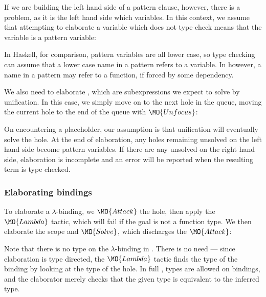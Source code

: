 If we are building the left hand side of a pattern clause, however, there is a
problem, as it is the left hand side which  variables. In this
context, we assume that attempting to elaborate a variable which does not type
check means that the variable is a pattern variable:


In Haskell, for comparison,
pattern variables are all lower case, so type checking can assume that a
lower case name in a pattern refers to a variable. In \Idris{} however, a
name in a pattern may refer to a function, if forced by some dependency.

We also need to elaborate , which are subexpressions we expect to
solve by unification. In this case, we simply move on to the next hole in the queue, moving
the current hole to the end of the queue with $\MO{Unfocus}$:


On encountering a placeholder, our assumption is that unification will
eventually solve the hole. At the end of elaboration, any holes remaining
unsolved on the left hand side become pattern variables. If there are any
unsolved on the right hand side, elaboration is incomplete and an error will
be reported when the resulting term is type checked.

\subsubsection{Elaborating bindings}

To elaborate a $\lambda$-binding, we $\MO{Attack}$ the hole, then apply the
$\MO{Lambda}$ tactic, which will fail if the goal is not a function type. We
then elaborate the scope and $\MO{Solve}$, which discharges the $\MO{Attack}$:


Note that there is no type on the $\lambda$-binding in \IdrisM{}. There is no need --- since
elaboration is type directed, the $\MO{Lambda}$ tactic finds the type of the binding by
looking at the type of the hole. In full \Idris{}, types are allowed on bindings, and the
elaborator merely checks that the given type is equivalent to the inferred type.

